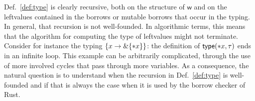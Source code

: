 Def.~\ref{def:type} is clearly recursive, both on the structure of $\mathsf{w}$ and
on the leftvalues contained in the borrows or mutable borrows that occur in the typing.
In general, that recursion is not well-founded. In algorithmic terms, this means
that the algorithm for computing the type of leftvalues might not terminate.
Consider for instance the typing $\{x\to\&\{\mathtt{*}x\}\}$:
the definition of $\mathsf{type}(\mathtt{*}x,\tau)$ ends in an infinite loop.
This example can be arbitrarily complicated, through the
use of more involved cycles that pass through more variables. As a consequence,
the natural question is to understand when the recursion in
Def.~\ref{def:type} is well-founded and if that is always the case when it is
used by the borrow checker of Rust.
